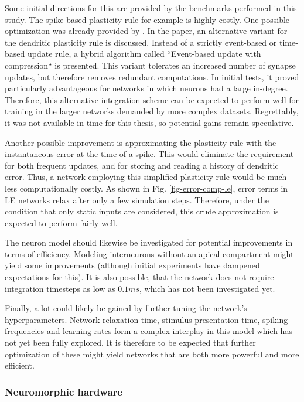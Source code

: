 Some initial directions for this are provided by the benchmarks performed in this study. The spike-based plasticity rule
for example is highly costly. One possible optimization was already provided by \citep{Stapmanns2021}. In the paper, an
alternative variant for the dendritic plasticity rule is discussed. Instead of a strictly event-based or time-based
update rule, a hybrid algorithm called ``Event-based update with compression`` is presented. This variant tolerates an
increased number of synapse updates, but therefore removes redundant computations. In initial tests, it proved
particularly advantageous for networks in which neurons had a large in-degree. Therefore, this alternative integration
scheme can be expected to perform well for training in the larger networks demanded by more complex datasets.
Regrettably, it was not available in time for this thesis, so potential gains remain speculative.

Another possible improvement is approximating the plasticity rule with the instantaneous error at the time of a spike.
This would eliminate the requirement for both frequent updates, and for storing and reading a history of
dendritic error. Thus, a network employing this simplified plasticity rule would be much less computationally costly. As
shown in Fig. \ref{fig-error-comp-le}, error terms in LE networks relax after only a few simulation steps. Therefore,
under the condition that only static inputs are considered, this crude approximation is expected to perform fairly well.

The neuron model should likewise be investigated for potential improvements in terms of efficiency. Modeling
interneurons without an apical compartment might yield some improvements (although initial experiments have dampened
expectations for this). It is also possible, that the network does not require integration timesteps as low as $0.1ms$,
which has not been investigated yet.

Finally, a lot could likely be gained by further tuning the network's hyperparameters. Network relaxation time, stimulus
presentation time, spiking frequencies and learning rates form a complex interplay in this model which has not yet been
fully explored. It is therefore to be expected that further optimization of these might yield networks that are both
more powerful and more efficient.


\subsubsection*{Neuromorphic hardware}

